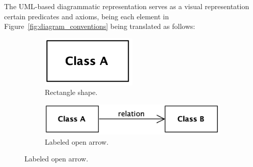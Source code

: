 \documentclass{article}
\begin{document}
The UML-based diagrammatic representation serves as a visual representation certain predicates and axioms, being each element in Figure~\ref{fig:diagram_conventions} being translated as follows:

\begin{figure}
    \centering
    \begin{subfigure}[b]{0.3\textwidth}
        \centering
        \includegraphics[width=0.5\textwidth]{diagrams/Conventions_Class.png}
        \caption{Rectangle shape.}
        \label{fig:diagram_conventions_rectangle}
    \end{subfigure}
    \qquad
    \centering
    \begin{subfigure}[b]{0.45\textwidth}
        \centering
        \includegraphics[width=\textwidth]{diagrams/Conventions_Relation.png}
        \caption{Labeled open arrow.}
        \label{fig:diagram_conventions_open_arrow}
    \end{subfigure}
    

\end{figure}
\end{document}
